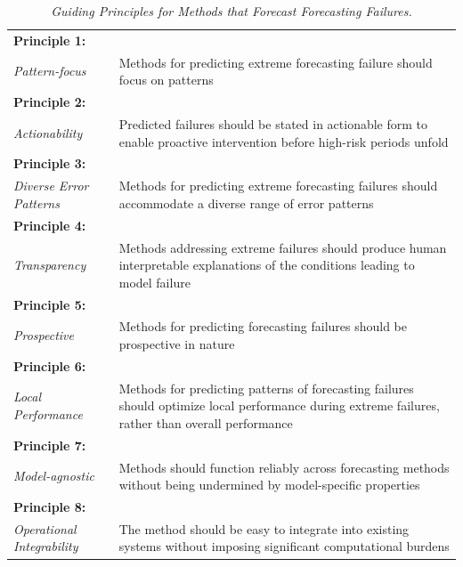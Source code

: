 \documentclass[preprint,12pt]{elsarticle}
\begin{document}
\begin{table}[ht]
\centering
\caption{\textit{Guiding Principles for Methods that Forecast Forecasting Failures.}}
\small
\renewcommand{\arraystretch}{1.5}
\begin{tabular}{|m{3cm}|m{12.5cm}|}
\hline
\centering\textbf{Principle 1:} \\ \centering\textit{Pattern-focus} & Methods for predicting extreme forecasting failure should focus on patterns \\
\hline
\centering\textbf{Principle 2:} \\ \centering\textit{Actionability} & Predicted failures should be stated in actionable form to enable proactive intervention before high-risk periods unfold \\
\hline
\centering\textbf{Principle 3:} \\ \centering\textit{Diverse Error Patterns} & Methods for predicting extreme forecasting failures should accommodate a diverse range of error patterns \\
\hline
\centering\textbf{Principle 4:} \\ \centering\textit{Transparency} & Methods addressing extreme failures should produce human interpretable explanations of the conditions leading to model failure \\
\hline
\centering\textbf{Principle 5:} \\ \centering\textit{Prospective} & Methods for predicting forecasting failures should be prospective in nature \\
\hline
\centering\textbf{Principle 6:} \\ \centering\textit{Local Performance} & Methods for predicting patterns of forecasting failures should optimize local performance during extreme failures, rather than overall performance \\
\hline
\centering\textbf{Principle 7:} \\ \centering\textit{Model-agnostic} & Methods should function reliably across forecasting methods without being undermined by model-specific properties \\
\hline
\centering\textbf{Principle 8:} \\ \centering\textit{Operational Integrability} & The method should be easy to integrate into existing  systems without imposing significant computational burdens \\
\hline
\end{tabular}
\label{tab:principles}
\end{table}
\end{document}

